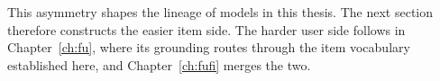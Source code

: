 This asymmetry shapes the lineage of models in this thesis. The next section
therefore constructs the easier item side. The harder user side follows in
Chapter~\ref{ch:fu}, where its grounding routes through the item vocabulary
established here, and Chapter~\ref{ch:fufi} merges the two.



